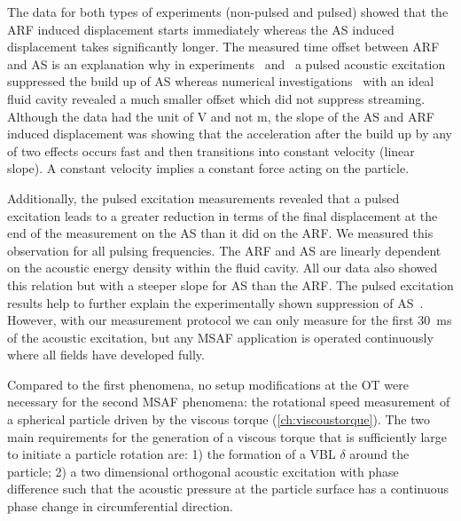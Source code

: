The data for both types of experiments (non-pulsed and pulsed) showed that the 
ARF induced displacement starts immediately whereas the AS induced displacement 
takes significantly longer. The measured time offset between ARF and AS is an 
explanation why in experiments~ and~ a 
pulsed acoustic excitation suppressed the build up of AS whereas numerical 
investigations~ with an ideal fluid cavity revealed a much 
smaller offset which did not suppress streaming. Although the data had the unit 
of \si{\volt} and not \si{\meter}, the slope of the AS and ARF induced 
displacement was showing that the acceleration after the build up by any of two 
effects occurs fast and then transitions into constant velocity (linear slope). 
A constant velocity implies a constant force acting on the particle.

Additionally, the pulsed excitation measurements revealed that a pulsed 
excitation leads to a greater reduction in terms of the final displacement at 
the end of the measurement on the AS than it did on the ARF. We measured this 
observation for all pulsing frequencies. The ARF and AS are linearly dependent 
on the acoustic energy density within the fluid cavity. All our data also 
showed this relation but with a steeper slope for AS than the ARF. The pulsed 
excitation results help to further explain the experimentally shown suppression 
of AS~\cite{Hoyos2013,Castro2016}. However, with our measurement protocol we 
can only measure for the first \SI{30}{\ms} of the acoustic excitation, but any 
MSAF application is operated continuously where all fields have developed 
fully.


Compared to the first phenomena, no setup modifications at the OT were 
necessary for the second MSAF phenomena: the rotational speed measurement of a 
spherical particle driven by the viscous torque (\cref{ch:viscoustorque}). The 
two main requirements for the generation of a viscous torque that is 
sufficiently large to initiate a particle rotation are: 1) the formation of a 
VBL $\delta$ around the particle; 2) a two dimensional orthogonal acoustic 
excitation with phase difference such that the acoustic pressure at the 
particle surface has a continuous phase change in circumferential direction.

